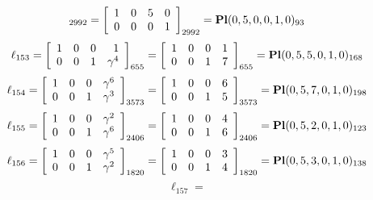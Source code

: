 \documentclass{article}
\begin{document}
{$$_{2992}
=
\left[
\begin{array}{*{4}c}
1  & 0  & 5  & 0\\
0  & 0  & 0  & 1\\
\end{array}
\right]_{2992}
={\rm\bf Pl}(0,5,0,0,1,0 )_{93}$$
$$
\ell_{153} = 
\left[
\begin{array}{*{4}{r}}
1 & 0 & 0 & 1\\
0 & 0 & 1 & \gamma^{4}\\
\end{array}
\right]
_{655}
=
\left[
\begin{array}{*{4}c}
1  & 0  & 0  & 1\\
0  & 0  & 1  & 7\\
\end{array}
\right]_{655}
={\rm\bf Pl}(0,5,5,0,1,0 )_{168}$$
$$
\ell_{154} = 
\left[
\begin{array}{*{4}{r}}
1 & 0 & 0 & \gamma^{6}\\
0 & 0 & 1 & \gamma^{3}\\
\end{array}
\right]
_{3573}
=
\left[
\begin{array}{*{4}c}
1  & 0  & 0  & 6\\
0  & 0  & 1  & 5\\
\end{array}
\right]_{3573}
={\rm\bf Pl}(0,5,7,0,1,0 )_{198}$$
$$
\ell_{155} = 
\left[
\begin{array}{*{4}{r}}
1 & 0 & 0 & \gamma^{2}\\
0 & 0 & 1 & \gamma^{6}\\
\end{array}
\right]
_{2406}
=
\left[
\begin{array}{*{4}c}
1  & 0  & 0  & 4\\
0  & 0  & 1  & 6\\
\end{array}
\right]_{2406}
={\rm\bf Pl}(0,5,2,0,1,0 )_{123}$$
$$
\ell_{156} = 
\left[
\begin{array}{*{4}{r}}
1 & 0 & 0 & \gamma^{5}\\
0 & 0 & 1 & \gamma^{2}\\
\end{array}
\right]
_{1820}
=
\left[
\begin{array}{*{4}c}
1  & 0  & 0  & 3\\
0  & 0  & 1  & 4\\
\end{array}
\right]_{1820}
={\rm\bf Pl}(0,5,3,0,1,0 )_{138}$$
$$
\ell_{157} = 
$$}
\end{document}
